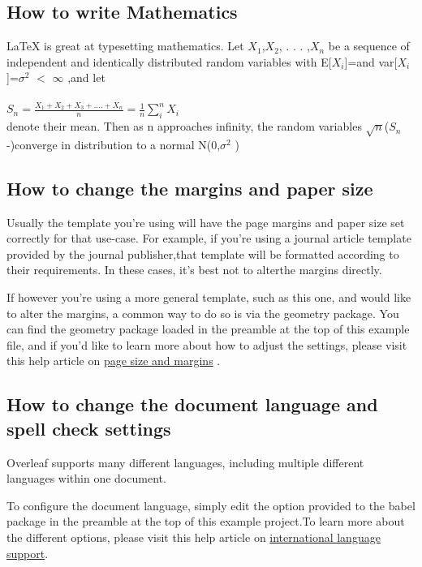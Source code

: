 \documentclass{article}
\begin{document}
  \subsection{How to write Mathematics}
 
\LaTeX{} is great at typesetting mathematics. Let $X_1$,$X_2$, . . . ,$X_n$ be a sequence of independent and identically distributed random variables with E[$X_i$]=\textmu and  var[$X_i$]=$\sigma^2$ $<$ $\infty$ ,and let
\\ \\

\begin{math}
	S_n=\frac{X_1+X_2+X_3+....+X_n}{n}=\frac{1}{n}\sum^n_i X_i
\end{math}
\\
denote their mean. Then as n approaches infinity, the random variables $\sqrt{n}$($S_n$-\textmu)converge in distribution to a normal N(0,$\sigma^2$ )
 \subsection{How to change the margins and paper size}
Usually the template you’re using will have the page margins and paper size set correctly for that use-case. For example, if you’re using a journal article template provided by the journal publisher,that template will be formatted according to their requirements. In these cases, it’s best not to alterthe margins directly.

  If however you’re using a more general template, such as this one, and would like to alter the margins, a common way to do so is via the geometry package. You can find the geometry package loaded in the preamble at the top of this example file, and if you’d like to learn more about how to adjust the settings, please visit this help article on  \href{https://www.overleaf.com/learn/latex/page_size_and_margins}{page size and margins} .
 
 \subsection{ How to change the document language and spell check settings}
  
  Overleaf supports many different languages, including multiple different languages within one document.
  
  To configure the document language, simply edit the option provided to the babel package in the preamble at the top of this example project.To learn more about the different options, please visit this help article on \href{https://www.overleaf.com/learn/latex/International_language_support}{international language support}.
  
\end{document}
